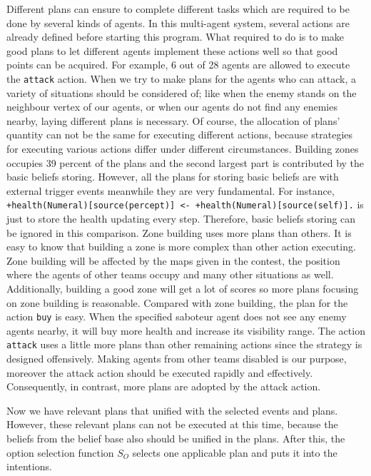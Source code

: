 Different plans can ensure to complete different tasks which are required to be done by several kinds of agents.
In this multi-agent system, several actions are already defined before starting this program.
What required to do is to make good plans to let different agents implement these actions well so that good points can be acquired.
For example, 6 out of 28 agents are allowed to execute the \texttt{attack} action.
When we try to make plans for the agents who can attack, a variety of situations should be considered of; like when the enemy stands on the neighbour vertex of our agents, or when our agents do not find any enemies nearby, laying different plans is necessary.
Of course, the allocation of plans' quantity can not be the same for executing different actions, because strategies for executing various actions differ under different circumstances.
Building zones occupies 39 percent of the plans and the second largest part is contributed by the basic beliefs storing.
However, all the plans for storing basic beliefs are with external trigger events meanwhile they are very fundamental.
For instance, \texttt{+health(Numeral)[source(percept)] <- +health(Numeral)[source(self)].} is just to store the health updating every step.
Therefore, basic beliefs storing can be ignored in this comparison.
Zone building uses more plans than others.
It is easy to know that building a zone is more complex than other action executing.
Zone building will be affected by the maps given in the contest, the position where the agents of other teams occupy and many other situations as well.
Additionally, building a good zone will get a lot of scores so more plans focusing on zone building is reasonable.
Compared with zone building, the plan for the action \texttt{buy} is easy.
When the specified saboteur agent does not see any enemy agents nearby, it will buy more health and increase its visibility range.
The action \texttt{attack} uses a little more plans than other remaining actions since the strategy is designed offensively.
Making agents from other teams disabled is our purpose, moreover the attack action should be executed rapidly and effectively.
Consequently, in contrast, more plans are adopted by the attack action.

Now we have relevant plans that unified with the selected events and plans.
However, these relevant plans can not be executed at this time, because the beliefs from the belief base also should be unified in the plans.
After this, the option selection function $S_O$ selects one applicable plan and puts it into the intentions.

